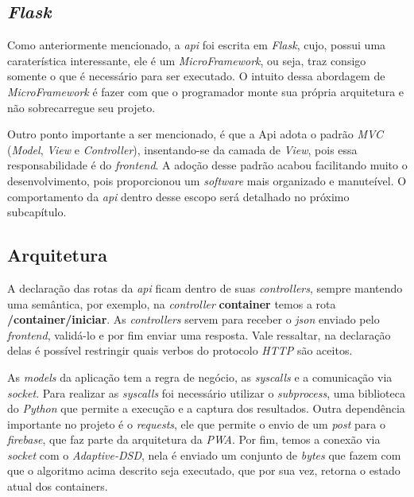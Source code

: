 \subsection{\textit{Flask}}
\label{sec:flask}

Como anteriormente mencionado, a \textit{api} foi escrita em \textit{Flask}, cujo, possui uma caraterística interessante, ele é um \textit{MicroFramework}, ou seja, traz consigo somente o que é necessário para ser executado. O intuito dessa abordagem de \textit{MicroFramework} é fazer com que o programador monte sua própria arquitetura e não sobrecarregue seu projeto. 

Outro ponto importante a ser mencionado, é que a Api adota o padrão \textit{MVC} (\textit{Model}, \textit{View} e \textit{Controller}), insentando-se da camada de \textit{View}, pois essa responsabilidade é do \textit{frontend}. A adoção desse padrão acabou facilitando muito o desenvolvimento, pois proporcionou um \textit{software} mais organizado e manuteível. O comportamento da \textit{api} dentro desse escopo será detalhado no próximo subcapítulo.

\subsection{Arquitetura}

A declaração das rotas da \textit{api} ficam dentro de suas \textit{controllers}, sempre mantendo uma semântica, por exemplo, na \textit{controller} \textbf{container} temos a rota \textbf{/container/iniciar}. As \textit{controllers} servem para receber o \textit{json} enviado pelo \textit{frontend}, validá-lo e por fim enviar uma resposta. Vale ressaltar, na declaração delas é possível restringir quais verbos do protocolo \textit{HTTP} são aceitos.

As \textit{models} da aplicação tem a regra de negócio, as \textit{syscalls} e a comunicação via \textit{socket}. Para realizar as \textit{syscalls} foi necessário utilizar o \textit{subprocess}, uma biblioteca do \textit{Python} que permite a execução e a captura dos resultados. Outra dependência importante no projeto é o \textit{requests}, ele que permite o envio de um \textit{post} para o \textit{firebase}, que faz parte da arquitetura da \textit{PWA}. Por fim, temos a conexão via \textit{socket} com o \textit{Adaptive-DSD}, nela é enviado um conjunto de \textit{bytes} que fazem com que o algoritmo acima descrito seja executado, que por sua vez, retorna o estado atual dos containers.



